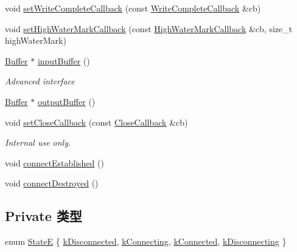 \begin{DoxyCompactItemize}
\item 
void \hyperlink{classmuduo_1_1net_1_1TcpConnection_a94b31be320453fc8aeae81b25934b43f}{set\+Write\+Complete\+Callback} (const \hyperlink{namespacemuduo_1_1net_a525c3730bfefb763975b035ebc88a63d}{Write\+Complete\+Callback} \&cb)
\item 
void \hyperlink{classmuduo_1_1net_1_1TcpConnection_ad44c03a6a6e2c20c87f2b8d296d42d2b}{set\+High\+Water\+Mark\+Callback} (const \hyperlink{namespacemuduo_1_1net_a503c5e91d2e84874e83e9a6cbfb4a47b}{High\+Water\+Mark\+Callback} \&cb, size\+\_\+t high\+Water\+Mark)
\item 
\hyperlink{classmuduo_1_1net_1_1Buffer}{Buffer} $\ast$ \hyperlink{classmuduo_1_1net_1_1TcpConnection_a7ba1453f8cf1f70df7cc2d1d0e6a53f5}{input\+Buffer} ()
\begin{DoxyCompactList}\small\item\em Advanced interface \end{DoxyCompactList}\item 
\hyperlink{classmuduo_1_1net_1_1Buffer}{Buffer} $\ast$ \hyperlink{classmuduo_1_1net_1_1TcpConnection_a0c97bb56837570d8964143833ad2e6a0}{output\+Buffer} ()
\item 
void \hyperlink{classmuduo_1_1net_1_1TcpConnection_acb32ba0eda160676b4fc98d756ee3515}{set\+Close\+Callback} (const \hyperlink{namespacemuduo_1_1net_a5a393be65a093bad5f5a6b8340ce8c88}{Close\+Callback} \&cb)
\begin{DoxyCompactList}\small\item\em Internal use only. \end{DoxyCompactList}\item 
void \hyperlink{classmuduo_1_1net_1_1TcpConnection_a2e1f9742dac98a0c3e5a5509920934ae}{connect\+Established} ()
\item 
void \hyperlink{classmuduo_1_1net_1_1TcpConnection_acde4a0b4bc840b44bfbf326bde562d3e}{connect\+Destroyed} ()
\end{DoxyCompactItemize}
\subsection*{Private 类型}
\begin{DoxyCompactItemize}
\item 
enum \hyperlink{classmuduo_1_1net_1_1TcpConnection_a8cf72f776f4277c8138a1beaf5185325}{StateE} \{ \hyperlink{classmuduo_1_1net_1_1TcpConnection_a8cf72f776f4277c8138a1beaf5185325a5f4e8711c6f39bc392c23dfacf44c953}{k\+Disconnected}, 
\hyperlink{classmuduo_1_1net_1_1TcpConnection_a8cf72f776f4277c8138a1beaf5185325adddfdd7363e62a5f443716e15d0bc1ff}{k\+Connecting}, 
\hyperlink{classmuduo_1_1net_1_1TcpConnection_a8cf72f776f4277c8138a1beaf5185325acb7fe9fd788a796e7d827c0303dcd405}{k\+Connected}, 
\hyperlink{classmuduo_1_1net_1_1TcpConnection_a8cf72f776f4277c8138a1beaf5185325a8fd5c7ab5a7aa063f1072c29b949f558}{k\+Disconnecting}
 \}
\end{DoxyCompactItemize}
